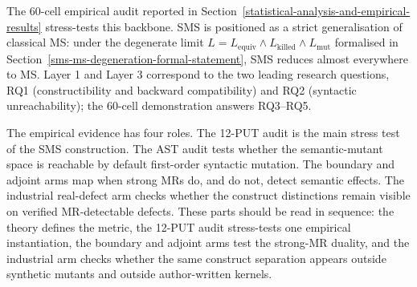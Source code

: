 \documentclass[manuscript,screen,review]{acmart}
\begin{document}
The 60-cell empirical audit reported in Section~\ref{statistical-analysis-and-empirical-results} stress-tests this
backbone. SMS is positioned as a strict generalisation of classical MS:
under the
degenerate limit $L = L_{\mathrm{equiv}} \wedge L_{\mathrm{killed}} \wedge L_{\mathrm{mut}}$
formalised in Section~\ref{sms-ms-degeneration-formal-statement}, SMS reduces almost everywhere to MS. Layer 1 and
Layer 3 correspond to the two leading research questions, RQ1
(constructibility and backward compatibility) and RQ2 (syntactic
unreachability); the 60-cell demonstration answers RQ3--RQ5.

The empirical evidence has four roles. The 12-PUT audit is the main
stress test of the SMS construction. The AST audit tests whether the
semantic-mutant space is reachable by default first-order syntactic
mutation. The boundary and adjoint arms map when strong MRs do, and do
not, detect semantic effects. The industrial real-defect arm checks whether
the construct distinctions remain visible on verified MR-detectable defects.
These parts should be read in sequence: the theory defines the metric,
the 12-PUT audit stress-tests one empirical instantiation, the boundary
and adjoint arms test the strong-MR duality, and the industrial arm
checks whether the same construct separation appears outside synthetic
mutants and outside author-written kernels.
\end{document}
